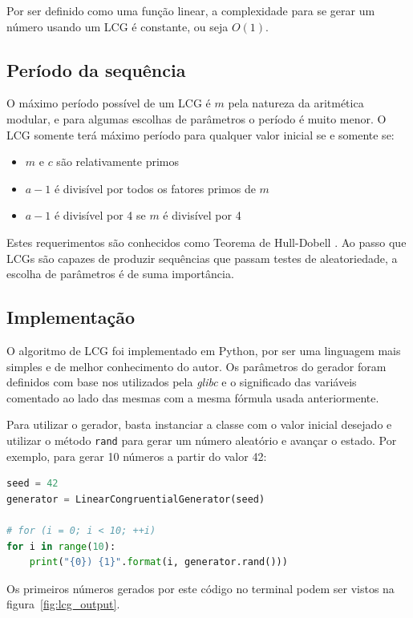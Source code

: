 \documentclass[12pt]{article}
\begin{document}
Por ser definido como uma função linear, a complexidade para se gerar um número
usando um LCG é constante, ou seja $O(1)$.

\subsection{Período da sequência}\label{lcg:period}

O máximo período possível de um LCG é $m$ pela natureza da aritmética modular,
e para algumas escolhas de parâmetros o período é muito menor. O LCG somente
terá máximo período para qualquer valor inicial se e somente se:
\begin{itemize}
    \item $m$ e $c$ são relativamente primos
    \item $a - 1$ é divisível por todos os fatores primos de $m$
    \item $a - 1$ é divisível por 4 se $m$ é divisível por 4
\end{itemize}
Estes requerimentos são conhecidos como Teorema de Hull-Dobell
\cite{severance:01}. Ao passo que LCGs são capazes de produzir sequências que
passam testes de aleatoriedade, a escolha de parâmetros é de suma importância.

\subsection{Implementação}

O algoritmo de LCG foi implementado em Python, por ser uma linguagem mais
simples e de melhor conhecimento do autor. Os parâmetros do gerador foram
definidos com base nos utilizados pela \textit{glibc} e o significado das
variáveis comentado ao lado das mesmas com a mesma fórmula usada anteriormente.



Para utilizar o gerador, basta instanciar a classe com o valor inicial desejado
e utilizar o método \texttt{rand} para gerar um número aleatório e avançar o
estado. Por exemplo, para gerar 10 números a partir do valor 42:

\begin{lstlisting}[language=Python]
seed = 42
generator = LinearCongruentialGenerator(seed)

# for (i = 0; i < 10; ++i)
for i in range(10):
    print("{0}) {1}".format(i, generator.rand()))
\end{lstlisting}

Os primeiros números gerados por este código no terminal podem ser vistos na
figura~\ref{fig:lcg_output}.
\end{document}
